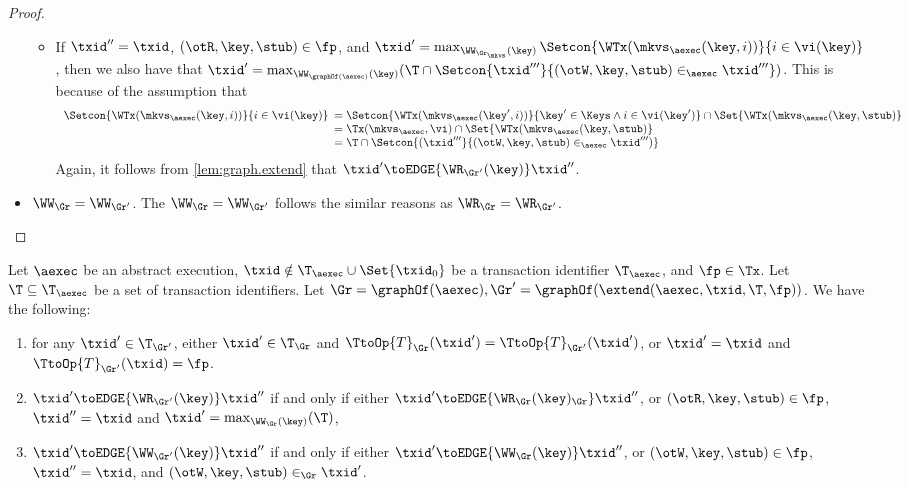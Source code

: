 \begin{proof}
\begin{itemize}
\begin{itemize}
\item If $\txid'' = \txid$, $(\otR, \key, \stub) \in \fp$, and $\txid' = \max_{\WW_{\Gr_\mkvs}(\key)} \Setcon{ \WTx(\mkvs_{\aexec}(\key, i)) }{ i \in \vi(\key)}$, 
    then we also have that $\txid' = \max_{\WW_{\graphOf(\aexec)}(\key)} (\T \cap \Setcon{ \txid''' }{ (\otW, \key, \stub) \in_{\aexec} \txid'''}) $. 
This is because of the assumption that 
\[
\begin{array}{l}
    \Setcon{\WTx(\mkvs_{\aexec}(\key, i)) }{ i \in \vi(\key)}
    \begin{array}[t]{l}
    = \Setcon{\WTx(\mkvs_{\aexec}(\key', i)) }{ \key' \in \Keys \wedge i \in \vi(\key')} \cap \Set{\WTx(\mkvs_{\aexec}(\key, \stub)} \\
= \Tx(\mkvs_{\aexec}, \vi) \cap \Set{\WTx(\mkvs_{\aexec}(\key, \stub)}  \\
= \T \cap \Setcon{(\txid''' }{ (\otW, \key, \stub) \in_{\aexec} \txid''')}
\end{array}
\end{array}
\]
Again, it follows from \cref{lem:graph.extend} that $\txid' \toEDGE{\WR_{\Gr'}(\key)} \txid''$. 
\end{itemize}
\item \( \WW_{\Gr} = \WW_{\Gr'}\). The \( \WW_{\Gr} = \WW_{\Gr'} \) follows the similar reasons as $\WR_{\Gr} = \WR_{\Gr'}$.
\end{itemize}
\end{proof}

\begin{lemma}
\label{lem:graph.extend}
Let $\aexec$ be an abstract execution, 
$\txid \notin \T_{\aexec} \cup \Set{\txid_0}$ be a transaction identifier $\T_{\aexec}$, and $\fp \in \Tx$. 
Let $\T \subseteq \T_{\aexec}$ be a set of transaction identifiers.
Let $\Gr = \graphOf(\aexec), \Gr' = \graphOf(\extend(\aexec, \txid, \T, \fp))$. 
We have the following: 
\begin{enumerate}
\item for any $\txid' \in \T_{\Gr'}$, either $\txid' \in \T_{\Gr}$ and $\TtoOp{T}_{\Gr}(\txid') = \TtoOp{T}_{\Gr'}(\txid')$, 
or $\txid' = \txid$ and $\TtoOp{T}_{\Gr'}(\txid) = \fp$.
\item $\txid' \toEDGE{\WR_{\Gr'}(\key)} \txid''$ if and only if either 
$\txid' \toEDGE{\WR_{\Gr}(\key)_{\Gr}} \txid''$, or $(\otR, \key, \stub) \in \fp$, $\txid'' = \txid$ and 
$\txid' = \max_{\WW_{\Gr}(\key)}(\T)$, 
\item $\txid' \toEDGE{\WW_{\Gr'}(\key)} \txid''$ if and only if 
either $\txid' \toEDGE{\WW_{\Gr}(\key)} \txid''$, or $(\otW, \key, \stub) \in \fp$, $\txid'' = \txid$, 
and $(\otW, \key, \stub) \in_{\Gr} \txid'$.
\end{enumerate}
\end{lemma}

